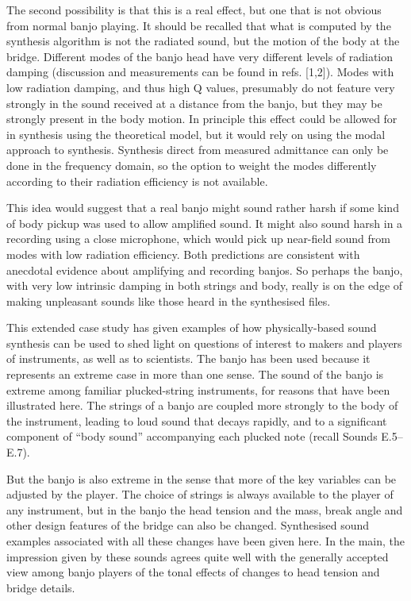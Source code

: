   The second possibility is that this is a real effect, but one that is not 
  obvious from normal banjo playing. It should be recalled that what is 
  computed by the synthesis algorithm is not the radiated sound, but the motion 
  of the body at the bridge. Different modes of the banjo head have very 
  different levels of radiation damping (discussion and measurements can be 
  found in refs. [1,2]). Modes with low radiation damping, and thus high Q 
  values, presumably do not feature very strongly in the sound received at a 
  distance from the banjo, but they may be strongly present in the body motion. 
  In principle this effect could be allowed for in synthesis using the 
  theoretical model, but it would rely on using the modal approach to 
  synthesis. Synthesis direct from measured admittance can only be done in the 
  frequency domain, so the option to weight the modes differently according to 
  their radiation efficiency is not available. 

  This idea would suggest that a real banjo might sound rather harsh if some 
  kind of body pickup was used to allow amplified sound. It might also sound 
  harsh in a recording using a close microphone, which would pick up near-field 
  sound from modes with low radiation efficiency. Both predictions are 
  consistent with anecdotal evidence about amplifying and recording banjos. So 
  perhaps the banjo, with very low intrinsic damping in both strings and body, 
  really is on the edge of making unpleasant sounds like those heard in the 
  synthesised files. 


  This extended case study has given examples of how physically-based sound 
  synthesis can be used to shed light on questions of interest to makers and 
  players of instruments, as well as to scientists. The banjo has been used 
  because it represents an extreme case in more than one sense. The sound of 
  the banjo is extreme among familiar plucked-string instruments, for reasons 
  that have been illustrated here. The strings of a banjo are coupled more 
  strongly to the body of the instrument, leading to loud sound that decays 
  rapidly, and to a significant component of ``body sound'' accompanying each 
  plucked note (recall Sounds E.5--E.7). 

  But the banjo is also extreme in the sense that more of the key variables can 
  be adjusted by the player. The choice of strings is always available to the 
  player of any instrument, but in the banjo the head tension and the mass, 
  break angle and other design features of the bridge can also be changed. 
  Synthesised sound examples associated with all these changes have been given 
  here. In the main, the impression given by these sounds agrees quite well 
  with the generally accepted view among banjo players of the tonal effects of 
  changes to head tension and bridge details. 


